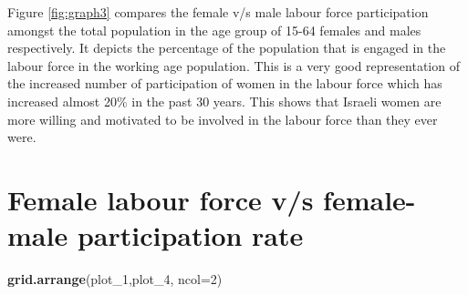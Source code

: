 \documentclass[11pt,a4paper,]{article}
\newenvironment{Shaded}{\begin{snugshade}}{\end{snugshade}}
\newcommand{\DataTypeTok}[1]{\textcolor[rgb]{0.13,0.29,0.53}{#1}}
\newcommand{\DecValTok}[1]{\textcolor[rgb]{0.00,0.00,0.81}{#1}}
\newcommand{\KeywordTok}[1]{\textcolor[rgb]{0.13,0.29,0.53}{\textbf{#1}}}
\newcommand{\NormalTok}[1]{#1}
\newcommand{\OperatorTok}[1]{\textcolor[rgb]{0.81,0.36,0.00}{\textbf{#1}}}
\newcommand{\StringTok}[1]{\textcolor[rgb]{0.31,0.60,0.02}{#1}}
\begin{document}
Figure \ref{fig:graph3} compares the female v/s male labour force participation amongst the total population in the age group of 15-64 females and males respectively. It depicts the percentage of the population that is engaged in the labour force in the working age population. This is a very good representation of the increased number of participation of women in the labour force which has increased almost 20\% in the past 30 years. This shows that Israeli women are more willing and motivated to be involved in the labour force than they ever were.

\hypertarget{female-labour-force-vs-female-male-participation-rate}{%
\section{Female labour force v/s female-male participation rate}\label{female-labour-force-vs-female-male-participation-rate}}

\begin{Shaded}
\end{Shaded}

\begin{Shaded}
\begin{Highlighting}[]
\KeywordTok{grid.arrange}\NormalTok{(plot_}\DecValTok{1}\NormalTok{,plot_}\DecValTok{4}\NormalTok{, }\DataTypeTok{ncol=}\DecValTok{2}\NormalTok{)}
\end{Highlighting}
\end{Shaded}
\end{document}
